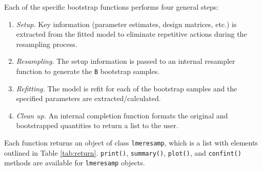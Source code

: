 Each of the specific bootstrap functions performs four general steps:

\begin{enumerate}
\def\labelenumi{\arabic{enumi}.}
\item
  \emph{Setup.} Key information (parameter estimates, design matrices, etc.) is extracted from the fitted model to eliminate repetitive actions during the resampling process.
\item
  \emph{Resampling.} The setup information is passed to an internal resampler function to generate the \texttt{B} bootstrap samples.
\item
  \emph{Refitting.} The model is refit for each of the bootstrap samples and the specified parameters are extracted/calculated.
\item
  \emph{Clean up.} An internal completion function formats the original and bootstrapped quantities to return a list to the user.
\end{enumerate}

\noindent Each function returns an object of class \texttt{lmeresamp}, which is a list with elements outlined in Table \ref{tab:return}. \texttt{print()}, \texttt{summary()}, \texttt{plot()}, and \texttt{confint()} methods are available for \texttt{lmeresamp} objects.

